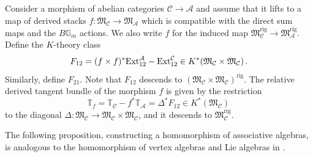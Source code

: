 \documentclass[12pt]{amsart}
\theoremstyle{definition}
\newcommand{\BG}{{\mathbb{G}}}
\newcommand{\BT}{{\mathbb{T}}}
\newcommand{\CA}{{\mathcal A}}
\newcommand{\CC}{{\mathcal C}}
\newcommand{\1}{\mathbf 1}
\newcommand{\FM}{{\mathfrak{M}}}
\newcommand{\Ext}{\mathcal{E}\text{xt}}
\newcommand{\rig}{\mathrm{rig}}
\renewcommand{\Ext}{\textup{Ext}}
\begin{document}
Consider a morphism of abelian categories $\CC\to \CA$ and assume that it lifts to a map of derived stacks $f\colon \FM_\CC\to \FM_\CA$ which is compatible with the direct sum maps and the $B\BG_m$ actions. We also write $f$ for the induced map $\FM_\CC^\rig\to \FM^\rig_\CA$. Define the $K$-theory class
\begin{equation}\label{eq: differenceExt}
F_{12}=(f\times f)^\ast \Ext^\CA_{12}-\Ext^\CC_{12}\in K^\ast(\FM_\CC\times \FM_\CC)\,.
\end{equation}
Similarly, define $F_{21}$. Note that $F_{12}$ descends to $(\FM_\CC\times \FM_\CC)^\rig$. The relative derived tangent bundle of the morphism $f$ is given by the restriction
\[\BT_f=\BT_{\CC}-f^\ast \BT_\CA=\Delta^\ast F_{12}\in K^\ast(\FM_{\CC})\,\]
to the diagonal $\Delta\colon \FM_\CC\to \FM_\CC\times\FM_\CC$, and it descends to $\FM_\CC^\rig$. 

The following proposition, constructing a homomorphism of associative algebras, is analogous to the homomorphism of vertex algebras and Lie algebras in \cite[Theorem 2.12]{GJT}.
\end{document}

